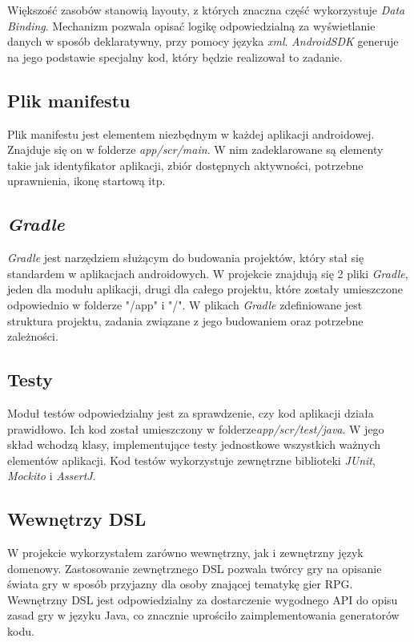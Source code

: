 \documentclass[openright]{xmgr}
\begin{document}
Większość zasobów stanowią layouty, z których znaczna część wykorzystuje \textit{Data Binding}. Mechanizm pozwala opisać logikę odpowiedzialną za wyświetlanie danych w sposób deklaratywny, przy pomocy języka \textit{xml}. \textit{AndroidSDK} generuje na jego podstawie specjalny kod, który będzie realizował to zadanie. 

\subsection*{Plik manifestu}
Plik manifestu jest elementem niezbędnym w każdej aplikacji androidowej. Znajduje się on w folderze \textit{app/scr/main}. W nim zadeklarowane są elementy takie jak identyfikator aplikacji, zbiór dostępnych aktywności, potrzebne uprawnienia, ikonę startową itp.

\subsection*{\textit{Gradle}}
\textit{Gradle} jest narzędziem służącym do budowania projektów, który stał się standardem w aplikacjach androidowych. W projekcie znajdują się 2 pliki \textit{Gradle}, jeden dla modułu aplikacji, drugi dla całego projektu, które zostały umieszczone odpowiednio w folderze "/app" i "/". W plikach \textit{Gradle} zdefiniowane jest struktura projektu, zadania związane z jego budowaniem oraz potrzebne zależności.

\subsection*{Testy}
Moduł testów odpowiedzialny jest za sprawdzenie, czy kod aplikacji działa prawidłowo. Ich  kod został umieszczony w folderze\textit{app/scr/test/java}. W jego skład wchodzą klasy, implementujące testy jednostkowe wszystkich ważnych elementów aplikacji. Kod testów wykorzystuje zewnętrzne biblioteki \textit{JUnit}, \textit{Mockito} i \textit{AssertJ}.

\subsection*{Wewnętrzy DSL}

W projekcie wykorzystałem zarówno wewnętrzny, jak i zewnętrzny język domenowy. Zastosowanie zewnętrznego DSL pozwala twórcy gry na opisanie świata gry w sposób przyjazny dla osoby znającej tematykę gier RPG.  Wewnętrzny DSL jest odpowiedzialny za dostarczenie wygodnego API do opisu zasad gry w języku Java, co znacznie uprościło zaimplementowania generatorów kodu.
\end{document}
